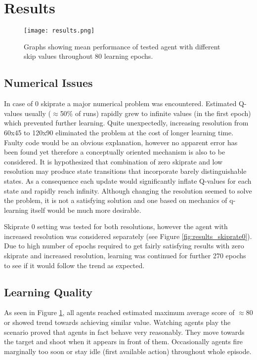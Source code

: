 \section{Results}
		\begin{figure}
			\centering
			\texttt{[image: results.png]}
			\caption{Graphs showing mean performance of tested agent with different skip values throughout 80 learning epochs.}\label{fig:results}
		\end{figure}
	\subsection{Numerical Issues}
		In case of 0 skiprate a major numerical problem was encountered. Estimated Q-values usually ($\approx$50\% of runs) rapidly grew to infinite values (in the first epoch) which prevented further learning. Quite unexpectedly, increasing resolution from 60x45 to 120x90 eliminated the problem at the cost of longer learning time. Faulty code would be an obvious explanation, however no apparent error has been found yet therefore a conceptually oriented mechanism is also to be considered. It is hypothesized that combination of zero skiprate and low resolution may produce state transitions that incorporate barely distinguishable states. As a consequence each update would significantly inflate Q-values for each state and rapidly reach infinity. Although changing the resolution seemed to solve the problem, it is not a satisfying solution and one based on mechanics of q-learning itself would be much more desirable.

		Skiprate 0 setting was tested for both resolutions, however the agent with increased resolution was considered separately (see Figure \ref{fig:results_skiprate0}). Due to high number of epochs required to get fairly satisfying results with zero skiprate and increased resolution, learning was continued for further 270 epochs to see if it would follow the trend as expected.

	\subsection{Learning Quality}
		As seen in Figure \ref{fig:results}, all agents reached estimated maximum average score of $\approx$80 or showed trend towards achieving similar value. Watching agents play the scenario proved that agents in fact behave very reasonably. They move towards the target and shoot when it appears in front of them. Occasionally agents fire marginally too soon or stay idle (first available action) throughout whole episode. 
		
